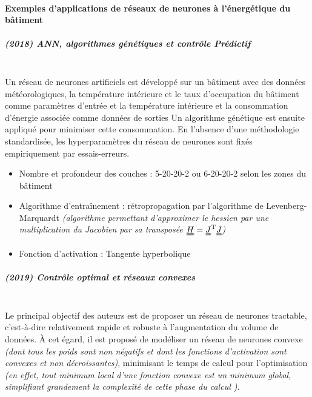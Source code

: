             \paragraph{Exemples d'applications de réseaux de neurones à l'énergétique du bâtiment}
                \subparagraph{(2018) ANN, algorithmes génétiques et contrôle Prédictif}~\cite{OC_NN}\\
                    Un réseau de neurones artificiels est développé sur un bâtiment avec des données météorologiques, la température intérieure et le
                    taux d'occupation du bâtiment comme paramètres d'entrée et la température intérieure et la consommation d'énergie associée comme données de sorties
                    Un algorithme génétique est ensuite appliqué pour minimiser cette consommation.
                    En l'absence d'une méthodologie standardisée, les hyperparamètres du réseau de neurones
                    sont fixés empiriquement par essais-erreurs.
                    \begin{itemize}
                        \item Nombre et profondeur des couches : 5-20-20-2 ou 6-20-20-2 selon les
                        zones du bâtiment
                        \item Algorithme d'entraînement : rétropropagation par l'algorithme de
                        Levenberg-Marquardt
                        \textit{(algorithme permettant d'approximer le hessien par une
                        multiplication du Jacobien par sa transposée $\uuline H= \uuline J^{\text T}\uuline J$)}
                        \item Fonction d'activation : Tangente hyperbolique
                    \end{itemize}
                \newpage
                \subparagraph{(2019) Contrôle optimal et réseaux convexes}\cite{REYNOLDS2018729}\\
                    Le principal objectif des auteurs est de proposer un réseau de neurones tractable,
                    c'est-à-dire relativement rapide et robuste à l'augmentation du volume de
                    données.
                    À cet égard, il est proposé de modéliser un réseau de neurones convexe
                    \textit{(dont tous les poids sont non négatifs et dont les fonctions d'activation sont convexes et non décroissantes)},
                    minimisant le temps de calcul pour l'optimisation
                    \textit{(en effet, tout minimum local d'une fonction convexe est un minimum
                    global, simplifiant grandement la complexité de cette phase du calcul
                    \cite{convex_optimization})}.
